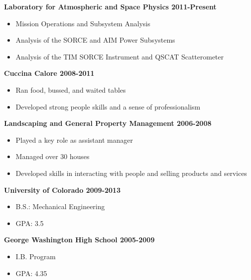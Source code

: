 \documentclass[11pt]{katz_resume}
\begin{document}
 \medskip
\noindent \centerline{\large \bf Laboratory for Atmospheric and Space Physics \hfill 2011-Present}
\begin{itemize}
    \item Mission Operations and Subsystem Analysis
    \item Analysis of the SORCE and AIM Power Subsystems
    \item Analysis of the TIM SORCE Instrument and QSCAT Scatterometer
\end{itemize}
\bigskip
\noindent \centerline{\large \bf Cuccina Calore \hfill 2008-2011}
\begin{itemize}
    \item Ran food, bussed, and waited tables
    \item Developed strong people skills and a sense of professionalism
\end{itemize}
\bigskip
\noindent \centerline{\large \bf Landscaping and General Property Management \hfill 2006-2008}
\begin{itemize}
    \item Played a key role as assistant manager
    \item Managed over 30 houses
    \item Developed skills in interacting with people and selling products and services
\end{itemize}
\bigskip
{} \medskip
\noindent \centerline{\large \bf University of Colorado \hfill 2009-2013}
\begin{itemize}
    \item B.S.: Mechanical Engineering
    \item GPA: 3.5
\end{itemize}
\noindent \centerline{\large \bf George Washington High School \hfill 2005-2009}
\begin{itemize}
    \item I.B. Program
    \item GPA: 4.35
\end{itemize}
\end{document}
